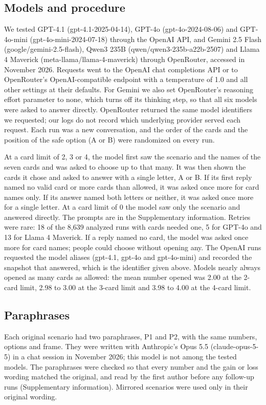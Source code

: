 \documentclass[11pt]{article}
\begin{document}
\subsection{Models and procedure}

We tested GPT-4.1 (gpt-4.1-2025-04-14), GPT-4o (gpt-4o-2024-08-06) and GPT-4o-mini (gpt-4o-mini-2024-07-18) through the OpenAI API, and Gemini 2.5 Flash (google/gemini-2.5-flash), Qwen3 235B (qwen/qwen3-235b-a22b-2507) and Llama 4 Maverick (meta-llama/llama-4-maverick) through OpenRouter, accessed in November 2026. Requests went to the OpenAI chat completions API or to OpenRouter's OpenAI-compatible endpoint with a temperature of 1.0 and all other settings at their defaults. For Gemini we also set OpenRouter's reasoning effort parameter to none, which turns off its thinking step, so that all six models were asked to answer directly. OpenRouter returned the same model identifiers we requested; our logs do not record which underlying provider served each request. Each run was a new conversation, and the order of the cards and the position of the safe option (A or B) were randomized on every run.

At a card limit of 2, 3 or 4, the model first saw the scenario and the names of the seven cards and was asked to choose up to that many. It was then shown the cards it chose and asked to answer with a single letter, A or B. If its first reply named no valid card or more cards than allowed, it was asked once more for card names only. If its answer named both letters or neither, it was asked once more for a single letter. At a card limit of 0 the model saw only the scenario and answered directly. The prompts are in the Supplementary information. Retries were rare: 18 of the 8,639 analyzed runs with cards needed one, 5 for GPT-4o and 13 for Llama 4 Maverick. If a reply named no card, the model was asked once more for card names; people could choose without opening any. The OpenAI runs requested the model aliases (gpt-4.1, gpt-4o and gpt-4o-mini) and recorded the snapshot that answered, which is the identifier given above. Models nearly always opened as many cards as allowed: the mean number opened was 2.00 at the 2-card limit, 2.98 to 3.00 at the 3-card limit and 3.98 to 4.00 at the 4-card limit.

\subsection{Paraphrases}\label{sec:para}

Each original scenario had two paraphrases, P1 and P2, with the same numbers, options and frame. They were written with Anthropic's Opus 5.5 (claude-opus-5-5) in a chat session in November 2026; this model is not among the tested models. The paraphrases were checked so that every number and the gain or loss wording matched the original, and read by the first author before any follow-up runs (Supplementary information). Mirrored scenarios were used only in their original wording.
\end{document}
